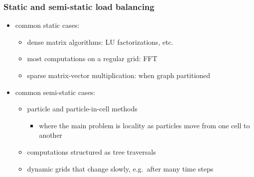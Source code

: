 \begin{frame}[fragile]
%
  \frametitle{Static and semi-static load balancing}
%
  \begin{itemize}
%
  \item common static cases:
    \begin{itemize}
    \item dense matrix algorithms: LU factorizations, etc.
    \item most computations on a regular grid: FFT
    \item sparse matrix-vector multiplication: when graph partitioned
    \end{itemize}
%
  \item common semi-static cases:
    \begin{itemize}
    \item particle and particle-in-cell methods
      \begin{itemize}
      \item where the main problem is locality as particles move from one cell to another
      \end{itemize}
    \item computations structured as tree traversals
    \item dynamic grids that change slowly, e.g.~after many time steps
    \end{itemize}
%
  \end{itemize}
%
\end{frame}

